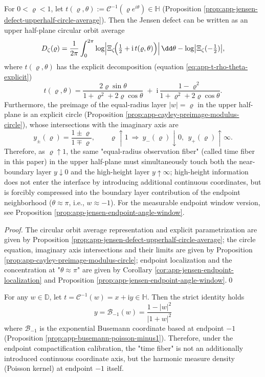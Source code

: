 \begin{theorem}\label{thm:dephys-timefiber-two-ended}
For \(0<\varrho<1\), let \(t(\varrho,\theta):=\mathcal{C}^{-1}(\varrho e^{i\theta})\in\mathbb{H}\) (Proposition \ref{prop:app-jensen-defect-upperhalf-circle-average}). Then the Jensen defect can be written as an upper half-plane circular orbit average
\[
D_{\zeta}(\varrho)=\frac{1}{2\pi}\int_{0}^{2\pi}\log\Bigl|\Xi_{\zeta}\!\Bigl(\tfrac12+\mathrm{i}\,t(\varrho,\theta)\Bigr)\Bigr|\,\dd\theta
-\log\bigl|\Xi_{\zeta}(-\tfrac12)\bigr|,
\]
where \(t(\varrho,\theta)\) has the explicit decomposition (equation \eqref{eq:app-t-rho-theta-explicit})
\[
t(\varrho,\theta)
=\frac{2\varrho\sin\theta}{1+\varrho^2+2\varrho\cos\theta}
\;+\;
\mathrm{i}\,\frac{1-\varrho^2}{1+\varrho^2+2\varrho\cos\theta}.
\]
Furthermore, the preimage of the equal-radius layer \(|w|=\varrho\) in the upper half-plane is an explicit circle (Proposition \ref{prop:app-cayley-preimage-modulus-circle}), whose intersections with the imaginary axis are
\[
y_{\pm}(\varrho)=\frac{1\pm\varrho}{1\mp\varrho},
\qquad
\varrho\uparrow 1\ \Longrightarrow\ y_{-}(\varrho)\downarrow 0,\ \ y_{+}(\varrho)\uparrow\infty.
\]
Therefore, as \(\varrho\uparrow 1\), the same "equal-radius observation fiber" (called time fiber in this paper) in the upper half-plane must simultaneously touch both the near-boundary layer \(y\downarrow 0\) and the high-height layer \(y\uparrow\infty\); high-height information does not enter the interface by introducing additional continuous coordinates, but is forcibly compressed into the boundary layer contribution of the endpoint neighborhood (\(\theta\approx\pi\), i.e., \(w\approx-1\)).
For the measurable endpoint window version, see Proposition \ref{prop:app-jensen-endpoint-angle-window}.
\end{theorem}

\begin{proof}
The circular orbit average representation and explicit parametrization are given by Proposition \ref{prop:app-jensen-defect-upperhalf-circle-average};
the circle equation, imaginary axis intersections and their limits are given by Proposition \ref{prop:app-cayley-preimage-modulus-circle};
endpoint localization and the concentration at "\(\theta\approx\pi\)" are given by Corollary \ref{cor:app-jensen-endpoint-localization} and Proposition \ref{prop:app-jensen-endpoint-angle-window}.\qed
\end{proof}

\begin{corollary}\label{cor:dephys-poisson-busemann-timefiber}
For any \(w\in\mathbb{D}\), let \(t=\mathcal{C}^{-1}(w)=x+\mathrm{i}y\in\mathbb{H}\).
Then the strict identity holds
\[
\boxed{\;y=\mathcal{B}_{-1}(w)=\frac{1-|w|^2}{|1+w|^2}\;}
\]
where \(\mathcal{B}_{-1}\) is the exponential Busemann coordinate based at endpoint \(-1\) (Proposition \ref{prop:app-busemann-poisson-minus1}).
Therefore, under the endpoint compactification calibration, the "time fiber" is not an additionally introduced continuous coordinate axis, but the harmonic measure density (Poisson kernel) at endpoint \(-1\) itself.
\end{corollary}

